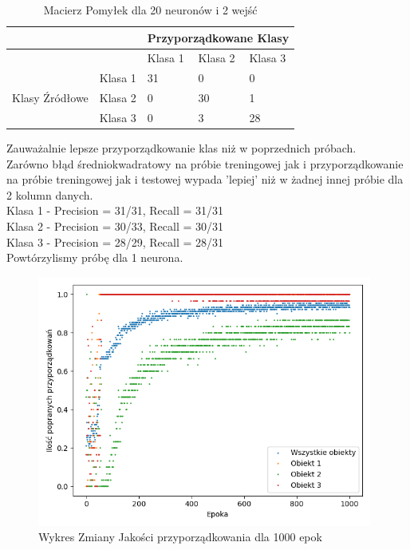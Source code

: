 \documentclass[12pt]{article}
\begin{document}
\begin{table}
\caption{\label{tab:tablica14} Macierz Pomyłek dla 20 neuronów i 2 wejść}
\begin{tabular}{ |p{3cm}|p{3cm}|p{2cm}|p{2cm}|p{2cm}|  }
 \hline
 & & 
 \multicolumn{3}{|c|}{Przyporządkowane Klasy} \\
 \hline

   & & Klasa 1 & Klasa 2 & Klasa 3\\
 \hline
\multirow{3}{4em}{Klasy Źródłowe}
   & Klasa 1 & 31 & 0 & 0 \\ 
   & Klasa 2 & 0  & 30 & 1 \\
   & Klasa 3 & 0  & 3  & 28 \\
 \hline
\end{tabular}
\end{table}

Zauważalnie lepsze przyporządkowanie klas niż w poprzednich próbach.\\Zarówno błąd średniokwadratowy na próbie treningowej jak i przyporządkowanie na próbie treningowej jak i testowej wypada 'lepiej' niż w żadnej innej próbie dla 2 kolumn danych.
\\Klasa 1 - Precision = 31/31, Recall = 31/31\\
Klasa 2 - Precision = 30/33, Recall = 30/31\\
Klasa 3 - Precision = 28/29, Recall = 28/31\\

\newpage
Powtórzylismy próbę dla 1 neurona.



\begin{figure}[!ht]
 \centering
 \includegraphics[width=11cm]{WykresPrzyporzadkowania1neuron2wejscia.png}
 \caption{Wykres Zmiany Jakości przyporządkowania dla 1000 epok}
 \vspace{-0.1cm}
 \label{WykresPrzyp16}
\end{figure}
\end{document}
